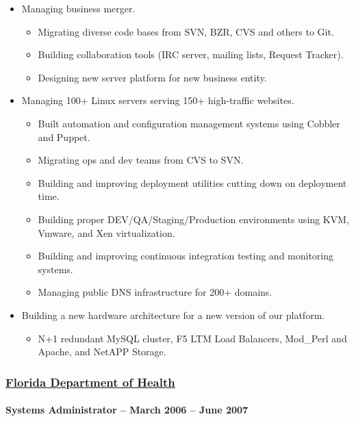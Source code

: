 \documentclass[fontsize=11pt]{scrartcl}
\begin{document}
\begin{itemize}
\item
  Managing business merger.

  \begin{itemize}
  \item
    Migrating diverse code bases from SVN, BZR, CVS and others to Git.
  \item
    Building collaboration tools (IRC server, mailing lists, Request
    Tracker).
  \item
    Designing new server platform for new business entity.
  \end{itemize}
\item
  Managing 100+ Linux servers serving 150+ high-traffic websites.

  \begin{itemize}
  \item
    Built automation and configuration management systems using Cobbler
    and Puppet.
  \item
    Migrating ops and dev teams from CVS to SVN.
  \item
    Building and improving deployment utilities cutting down on
    deployment time.
  \item
    Building proper DEV/QA/Staging/Production environments using KVM,
    Vmware, and Xen virtualization.
  \item
    Building and improving continuous integration testing and monitoring
    systems.
  \item
    Managing public DNS infrastructure for 200+ domains.
  \end{itemize}
\item
  Building a new hardware architecture for a new version of our
  platform.

  \begin{itemize}
  \itemsep1pt\parskip0pt
  \item
    N+1 redundant MySQL cluster, F5 LTM Load Balancers, Mod\_Perl and
    Apache, and NetAPP Storage.
  \end{itemize}
\end{itemize}

\subsubsection{\href{http://www.doh.state.fl.us/}{Florida Department of
Health}}\label{florida-department-of-health}

\paragraph{Systems Administrator -- March 2006 -- June
2007}\label{systems-administrator-march-2006-june-2007}
\end{document}
